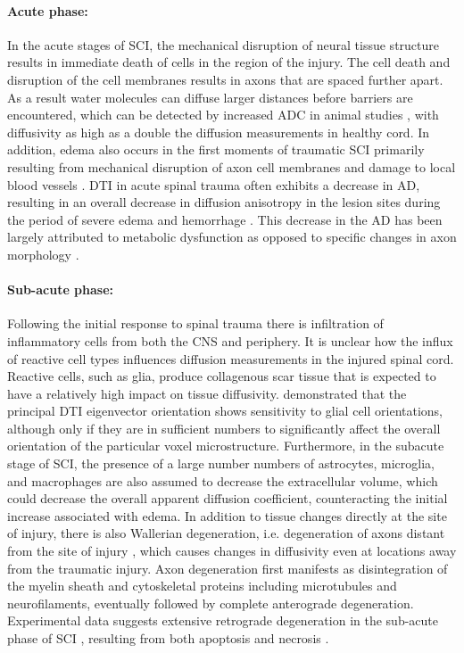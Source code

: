 \paragraph{Acute phase: }
In the acute stages of \gls{SCI}, the mechanical disruption of neural tissue structure results in immediate death of cells in the region of the injury. The cell death and disruption of the cell membranes results in axons that are spaced further apart. As a result water molecules can diffuse larger distances before barriers are encountered, which can be detected by increased \gls{ADC} in animal studies \citep{Ford:2005, Deo:2006}, with diffusivity as high as a double the diffusion measurements in healthy cord. In addition, edema also occurs in the first moments of traumatic \gls{SCI} primarily resulting from mechanical disruption of axon cell membranes and damage to local blood vessels \citep{Balentine:1978,Mautes:2000}.  \Gls{DTI} in acute spinal trauma often exhibits a decrease in \gls{AD}, resulting in an overall decrease in diffusion anisotropy in the lesion sites during the period of severe edema and hemorrhage \citep{Ford:2005}.  This decrease in the \gls{AD} has been largely attributed to metabolic dysfunction as opposed to specific changes in axon morphology \citep{Schwartz:2003}. 
%
%
\paragraph{Sub-acute phase: }
Following the initial response to spinal trauma there is infiltration of inflammatory cells from both the \gls{CNS} and periphery.  It is unclear how the influx of reactive cell types influences diffusion measurements in the injured spinal cord.  Reactive cells, such as glia, produce collagenous scar tissue that is expected to have a relatively high impact on tissue diffusivity.   demonstrated that  the principal DTI eigenvector orientation shows sensitivity to glial cell orientations, although only if they are in sufficient numbers to significantly affect the overall orientation of the particular voxel microstructure.  Furthermore, in the subacute stage of SCI, the presence of a large number numbers of astrocytes, microglia, and macrophages are also assumed to decrease the extracellular volume, which could decrease the overall apparent diffusion coefficient, counteracting the initial increase associated with edema.
%
%
% 
In addition to tissue changes directly at the site of injury,  there is also Wallerian degeneration, i.e. degeneration of axons distant from the site of injury \citep{Waxman:1989}, which causes changes in diffusivity even at locations away from the traumatic injury.  Axon degeneration first manifests as disintegration of the myelin sheath and cytoskeletal proteins including microtubules and neurofilaments, eventually followed by  complete anterograde degeneration. Experimental data suggests extensive retrograde degeneration in the sub-acute phase of \gls{SCI} \citep{Cajal:1928,Kalil:1975,Pallini:1988}, resulting from both apoptosis and necrosis \citep{Crowe:1997}.



